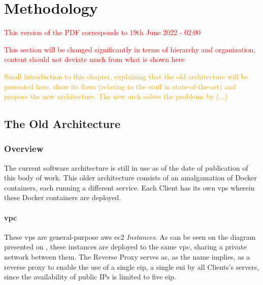 \chapter{Methodology}\label{methodology}


\textcolor{red}{This version of the PDF corresponds to 19th June 2022 - 02:00}

\textcolor{red}{ This section will be changed significantly in terms of hierarchy and organization, content should not deviate much from what is shown here}

\textcolor{orange}{ Small introduction to this chapter, explaining that the old architecture will be presented here, show its flaws (relating to the stuff in state-of-the-art) and propose the new architecture. The new arch solves the problems by (...) }

\section{The Old Architecture}\label{methodology:s:the-old-architecture}

\subsection{Overview}\label{methodology:ss:overview}


The current software architecture is still in use as of the date of publication of this body of work. This older architecture consists of an amalgamation of Docker containers, each running a different service. Each Client has its own \gls{vps} wherein these Docker containers are deployed. 


\subsubsection{\gls{vpc}}\label{methodology:sss:vpc}

These \gls{vps} are general-purpose \gls{aws} \gls{ec2} \textit{Instances}. As can be seen on the diagram presented on , these instances are deployed to the same \gls{vpc}, sharing a private network between them. The Reverse Proxy serves as, as the name implies, as a reverse proxy to enable the use of a single \gls{eip}, a single \gls{eni} by all Clients's servers, since the availability of public IPs is limited to five \gls{eip}.




